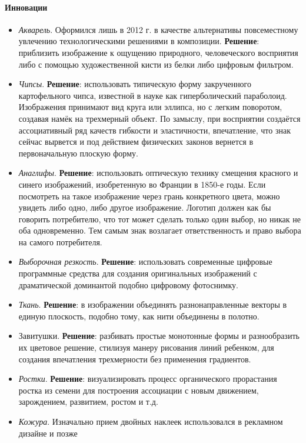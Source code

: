 \paragraph{Инновации}
\begin{itemize}
\item \emph{Акварель}. Оформился лишь в 2012 г. в качестве альтернативы повсеместному увлечению
  технологическими решениями в композиции. \textbf{Решение}:  приблизить изображение к ощущению
  природного, человеческого восприятия либо с помощью художественной кисти из белки либо цифровым
  фильтром.
\item \emph{Чипсы}. \textbf{Решение}: использовать типическую форму закрученного картофельного
  чипса, известной в науке как гиперболический параболоид. Изображения принимают вид круга или
  эллипса, но с легким поворотом, создавая намёк на трехмерный объект. По замыслу, при восприятии
  создаётся ассоциативный ряд качеств гибкости и эластичности, впечатление, что знак сейчас
  вырвется и под действием физических законов вернется в первоначальную плоскую форму.
\item \emph{Анаглифы}. \textbf{Решение}: использовать оптическую технику смещения красного и
  синего изображений, изобретенную во Франции в 1850-е годы. Если посмотреть на такое изображение
  через грань конкретного цвета, можно увидеть либо одно, либо другое изображение. Логотип должен
  как бы говорить потребителю, что тот может сделать только один выбор, но никак не оба
  одновременно. Тем самым знак возлагает ответственность и право выбора на самого потребителя.
\item \emph{Выборочная резкость}. \textbf{Решение}: использовать современные цифровые программные
  средства для создания оригинальных изображений с драматической доминантой подобно цифровому
  фотоснимку.
\item \emph{Ткань}. \textbf{Решение}: в изображении объединять разнонаправленные векторы в единую
  плоскость, подобно тому, как нити объединены в полотно.
\item Завитушки. \textbf{Решение}: разбивать простые монотонные формы и разнообразить их цветовое
  решение, стилизуя манеру рисования линий ребенком, для создания впечатления трехмерности без
  применения градиентов.
\item \emph{Ростки}. \textbf{Решение}: визуализировать процесс органического прорастания ростка из
  семени для построения ассоциации с новым движением, зарождением, развитием, ростом и т.д.
\item \emph{Кожура}. Изначально прием двойных наклеек использовался в рекламном дизайне и позже

\end{itemize}
